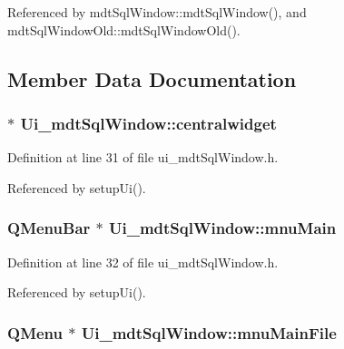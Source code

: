 Referenced by mdt\-Sql\-Window\-::mdt\-Sql\-Window(), and mdt\-Sql\-Window\-Old\-::mdt\-Sql\-Window\-Old().



\subsection{Member Data Documentation}
\hypertarget{class_ui__mdt_sql_window_ad4fe69de0e25edbc0b197f0bcf62632a}{
\subsubsection[{centralwidget}]{ $\ast$ Ui\-\_\-mdt\-Sql\-Window\-::centralwidget}}\label{class_ui__mdt_sql_window_ad4fe69de0e25edbc0b197f0bcf62632a}


Definition at line 31 of file ui\-\_\-mdt\-Sql\-Window.\-h.



Referenced by setup\-Ui().

\hypertarget{class_ui__mdt_sql_window_a2cdcd27d2a4c021236a1d2adfa483cb5}{
\subsubsection[{mnu\-Main}]{\setlength{\rightskip}{0pt plus 5cm}Q\-Menu\-Bar $\ast$ Ui\-\_\-mdt\-Sql\-Window\-::mnu\-Main}}\label{class_ui__mdt_sql_window_a2cdcd27d2a4c021236a1d2adfa483cb5}


Definition at line 32 of file ui\-\_\-mdt\-Sql\-Window.\-h.



Referenced by setup\-Ui().

\hypertarget{class_ui__mdt_sql_window_aad9106c68c6839271df273119b5b74c8}{
\subsubsection[{mnu\-Main\-File}]{\setlength{\rightskip}{0pt plus 5cm}Q\-Menu $\ast$ Ui\-\_\-mdt\-Sql\-Window\-::mnu\-Main\-File}}\label{class_ui__mdt_sql_window_aad9106c68c6839271df273119b5b74c8}


